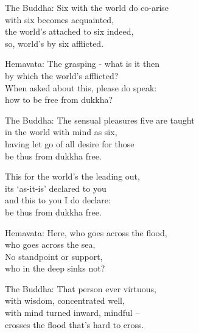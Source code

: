 \begin{MyDescription}{The Buddha:}
Six with the world do co-arise\\
with six becomes acquainted,\\
the world's attached to six indeed,\\
so, world's by six afflicted.
\end{MyDescription}   

\begin{MyDescription}{Hemavata:}
The grasping  - what is it then\\
by which the world's afflicted?\\
When asked about this, please do speak:\\
how to be free from dukkha?	
\end{MyDescription}   
   
\begin{MyDescription}{The Buddha:}
The sensual pleasures five are taught\\
in the world with mind as six,\\
having let go of all desire for those\\
be thus from dukkha free.
\end{MyDescription}   

\begin{MyDescription}{}
This for the world's the leading out,\\
its `as-it-is' declared to you\\
and this to you I do declare:\\
be thus from dukkha free.
\end{MyDescription}      


\begin{MyDescription}{Hemavata:}
Here, who goes across the flood,\\
who goes across the sea,\\
No standpoint or support,\\
who in the deep sinks not?	
\end{MyDescription}      


\begin{MyDescription}{The Buddha:}
That person ever virtuous,\\
with wisdom, concentrated well,\\
with mind turned inward, mindful – \\
crosses the flood that's hard to cross.
\end{MyDescription}      


